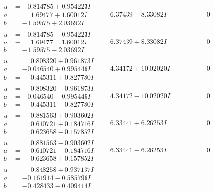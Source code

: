\documentclass[1p]{elsarticle_modified}
\theoremstyle{definition}
\begin{document}
$$\begin{array}{c|c|c}
\begin{aligned}
u &= -0.814785 + 0.954223 I \\
a &= \phantom{-}1.69477 + 1.60012 I \\
b &= -1.59575 + 2.03692 I\end{aligned}
 & \phantom{-}6.37439 - 8.33082 I & \phantom{-0.000000 } 0 \\ \hline\begin{aligned}
u &= -0.814785 - 0.954223 I \\
a &= \phantom{-}1.69477 - 1.60012 I \\
b &= -1.59575 - 2.03692 I\end{aligned}
 & \phantom{-}6.37439 + 8.33082 I & \phantom{-0.000000 } 0 \\ \hline\begin{aligned}
u &= \phantom{-}0.808320 + 0.961873 I \\
a &= -0.046540 + 0.995446 I \\
b &= \phantom{-}0.445311 + 0.827780 I\end{aligned}
 & \phantom{-}4.34172 + 10.02020 I & \phantom{-0.000000 } 0 \\ \hline\begin{aligned}
u &= \phantom{-}0.808320 - 0.961873 I \\
a &= -0.046540 - 0.995446 I \\
b &= \phantom{-}0.445311 - 0.827780 I\end{aligned}
 & \phantom{-}4.34172 - 10.02020 I & \phantom{-0.000000 } 0 \\ \hline\begin{aligned}
u &= \phantom{-}0.881563 + 0.903602 I \\
a &= \phantom{-}0.610721 + 0.184716 I \\
b &= \phantom{-}0.623658 - 0.157852 I\end{aligned}
 & \phantom{-}6.33441 + 6.26253 I & \phantom{-0.000000 } 0 \\ \hline\begin{aligned}
u &= \phantom{-}0.881563 - 0.903602 I \\
a &= \phantom{-}0.610721 - 0.184716 I \\
b &= \phantom{-}0.623658 + 0.157852 I\end{aligned}
 & \phantom{-}6.33441 - 6.26253 I & \phantom{-0.000000 } 0 \\ \hline\begin{aligned}
u &= \phantom{-}0.848258 + 0.937137 I \\
a &= -0.161914 - 0.585796 I \\
b &= -0.428433 - 0.409414 I\end{aligned}

\end{array}$$
\end{document}
